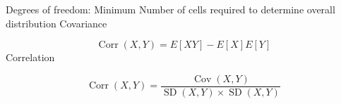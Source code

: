 
Degrees of freedom: Minimum Number of cells required to determine overall distribution
Covariance

\[\operatorname{Corr}(X,Y) = E[XY] - E[X]E[Y] \]
Correlation

\[  \operatorname{Corr}(X,Y) = \frac{\operatorname{Cov}(X,Y)}{\operatorname{SD}(X,Y) \times \operatorname{SD}(X,Y)}   \]
